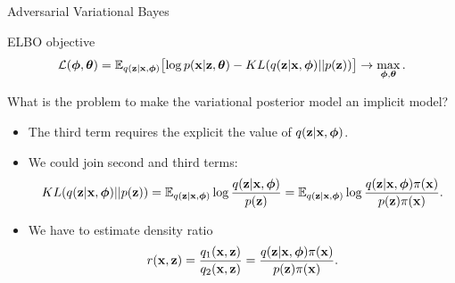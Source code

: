 \begin{frame}{Adversarial Variational Bayes}
	\begin{block}{ELBO objective}
		\vspace{-0.5cm}
		\[
			 \mathcal{L} (\boldsymbol{\phi}, \boldsymbol{\theta})  = \mathbb{E}_{q(\mathbf{z} | \mathbf{x}, \boldsymbol{\phi})} \bigl[\log p(\mathbf{x} | \mathbf{z}, \boldsymbol{\theta}) - KL(q(\mathbf{z}| \mathbf{x}, \boldsymbol{\phi}) || p(\mathbf{z}))  \bigr] \rightarrow \max_{\boldsymbol{\phi}, \boldsymbol{\theta}}.
		\]	
		\vspace{-0.5cm}
	\end{block}
	What is the problem to make the variational posterior model an implicit model?
	\begin{itemize}
	\item The third term requires the explicit the value of $q(\mathbf{z} | \mathbf{x}, \boldsymbol{\phi})$.
	\item We could join second and third terms:
		\vspace{-0.2cm}
		{\small
		\[
			KL(q(\mathbf{z}| \mathbf{x}, \boldsymbol{\phi}) || p(\mathbf{z})) = \mathbb{E}_{q(\mathbf{z} | \mathbf{x}, \boldsymbol{\phi})} \log \frac{q(\mathbf{z}| \mathbf{x}, \boldsymbol{\phi})}{p(\mathbf{z})} = \mathbb{E}_{q(\mathbf{z} | \mathbf{x}, \boldsymbol{\phi})} \log \frac{q(\mathbf{z}| \mathbf{x}, \boldsymbol{\phi}) \pi (\mathbf{x})}{p(\mathbf{z}) \pi(\mathbf{x})}.
		\]
		}
		\vspace{-0.5cm}
	\item We have to estimate density ratio 
		\vspace{-0.2cm}
		\[
			r(\mathbf{x}, \mathbf{z}) = \frac{q_1(\mathbf{x}, \mathbf{z})}{q_2(\mathbf{x}, \mathbf{z})} = \frac{q(\mathbf{z}| \mathbf{x}, \boldsymbol{\phi}) \pi (\mathbf{x})}{p(\mathbf{z}) \pi(\mathbf{x})}.
		\] 
	\end{itemize}
\end{frame}
